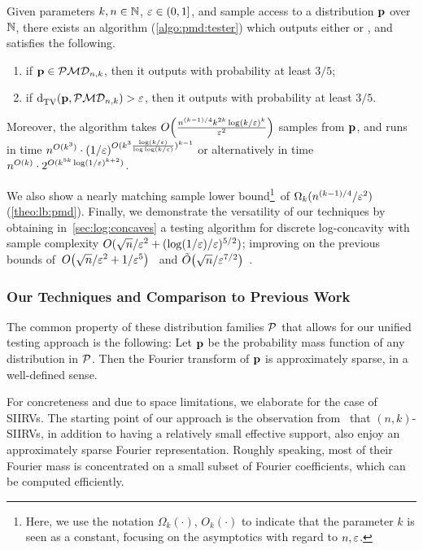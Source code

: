 \begin{theorem}\label{theo:testing:pmd}
    Given parameters $k,n\in\N$, $\eps\in(0,1]$, and sample access to a distribution $\p$ over $\N$, there exists an algorithm (\cref{algo:pmd:tester}) which outputs either \accept or \reject, and satisfies the following.
    \begin{enumerate}
        \item if $\p \in \classpmd[n]{k}$, then it outputs \accept with probability at least $3/5$;
        \item if $\totalvardist{\p}{\classpmd[n]{k}} > \eps$, then it outputs \reject with probability at least $3/5$.
    \end{enumerate}
    Moreover, the algorithm takes $\bigO{\frac{n^{(k-1)/4} k^{2k} \log(k/\eps)^k}{\eps^2}}$ samples from $\p$, 
    and runs in time $n^{O(k^3)} \cdot (1/\eps)^{O(k^3\frac{\log(k/\eps)}{\log\log(k/\eps)})^{k-1}}$ or alternatively in time $n^{O(k)} \cdot  2^{O(k^{5k} \log(1/\eps)^{k+2})}$.
\end{theorem}
We also show a nearly matching sample lower bound\footnote{Here, we use the notation $\Omega_k(\cdot)$, $O_k(\cdot)$ to indicate that the parameter $k$ is seen as a constant, focusing on the asymptotics with regard to $n,\eps$.}\ of $\Omega_k( n^{{(k-1)}/{4}}/\eps^2 )$ (\cref{theo:lb:pmd}). Finally, we demonstrate the versatility of our techniques by obtaining in~\cref{sec:log:concaves} a testing algorithm for discrete log-concavity with sample complexity $O(\sqrt{n}/\eps^2 + (\log(1/\eps)/\eps)^{5/2})$; improving on the previous bounds of~$\bigO{{\sqrt{n}}/{\eps^{2}}+{1}/{\eps^5}}$~\cite{ADK:15} and $\tildeO{{\sqrt{n}}/{\eps^{7/2}}}$~\cite{CDGR:16}.


\subsubsection{Our Techniques and Comparison to Previous Work} \label{ssec:techniques}

The common property of these distribution families $\property$ that allows for our unified testing approach
is the following: Let $\p$ be the probability mass function of any distribution in $\property$. Then the Fourier transform
of $\p$ is approximately sparse, in a well-defined sense. 

For concreteness and due to space limitations,  we elaborate for the case of SIIRVs.
The starting point of our approach is the observation from~\cite{DKS:15} that $(n,k)$-SIIRVs, 
in addition to having a relatively small effective support, also enjoy an approximately sparse Fourier representation. 
Roughly speaking, most of their Fourier mass is concentrated on a small subset of Fourier coefficients, which can be computed efficiently.

